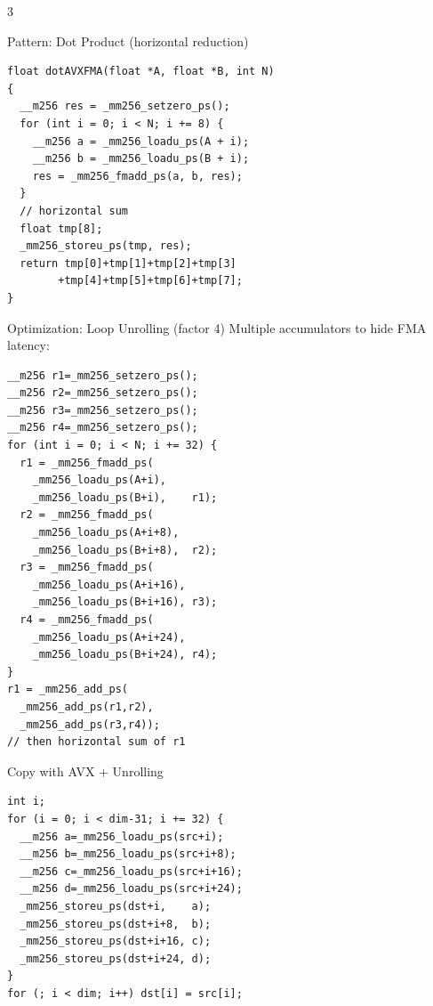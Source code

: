 \documentclass[8pt,a4paper,landscape]{article}
\begin{document}
\begin{multicols}{3}
\begin{accentbox}{Pattern: Dot Product (horizontal reduction)}
\begin{lstlisting}
float dotAVXFMA(float *A, float *B, int N)
{
  __m256 res = _mm256_setzero_ps();
  for (int i = 0; i < N; i += 8) {
    __m256 a = _mm256_loadu_ps(A + i);
    __m256 b = _mm256_loadu_ps(B + i);
    res = _mm256_fmadd_ps(a, b, res);
  }
  // horizontal sum
  float tmp[8];
  _mm256_storeu_ps(tmp, res);
  return tmp[0]+tmp[1]+tmp[2]+tmp[3]
        +tmp[4]+tmp[5]+tmp[6]+tmp[7];
}
\end{lstlisting}
\end{accentbox}

\begin{accentbox}{Optimization: Loop Unrolling (factor 4)}
{\scriptsize Multiple accumulators to hide FMA latency:}
\begin{lstlisting}
__m256 r1=_mm256_setzero_ps();
__m256 r2=_mm256_setzero_ps();
__m256 r3=_mm256_setzero_ps();
__m256 r4=_mm256_setzero_ps();
for (int i = 0; i < N; i += 32) {
  r1 = _mm256_fmadd_ps(
    _mm256_loadu_ps(A+i),
    _mm256_loadu_ps(B+i),    r1);
  r2 = _mm256_fmadd_ps(
    _mm256_loadu_ps(A+i+8),
    _mm256_loadu_ps(B+i+8),  r2);
  r3 = _mm256_fmadd_ps(
    _mm256_loadu_ps(A+i+16),
    _mm256_loadu_ps(B+i+16), r3);
  r4 = _mm256_fmadd_ps(
    _mm256_loadu_ps(A+i+24),
    _mm256_loadu_ps(B+i+24), r4);
}
r1 = _mm256_add_ps(
  _mm256_add_ps(r1,r2),
  _mm256_add_ps(r3,r4));
// then horizontal sum of r1
\end{lstlisting}
\end{accentbox}

\begin{sectionbox}{Copy with AVX + Unrolling}
\begin{lstlisting}
int i;
for (i = 0; i < dim-31; i += 32) {
  __m256 a=_mm256_loadu_ps(src+i);
  __m256 b=_mm256_loadu_ps(src+i+8);
  __m256 c=_mm256_loadu_ps(src+i+16);
  __m256 d=_mm256_loadu_ps(src+i+24);
  _mm256_storeu_ps(dst+i,    a);
  _mm256_storeu_ps(dst+i+8,  b);
  _mm256_storeu_ps(dst+i+16, c);
  _mm256_storeu_ps(dst+i+24, d);
}
for (; i < dim; i++) dst[i] = src[i];
\end{lstlisting}
\end{sectionbox}


\end{multicols}
\end{document}
